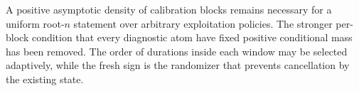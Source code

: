 \begin{remark}
A positive asymptotic density of calibration blocks remains necessary for a
uniform root-\(n\) statement over arbitrary exploitation policies.  The
stronger per-block condition that every diagnostic atom have fixed positive
conditional mass has been removed.  The order of durations inside each
window may be selected adaptively, while the fresh sign is the randomizer that
prevents cancellation by the existing state.
\end{remark}
